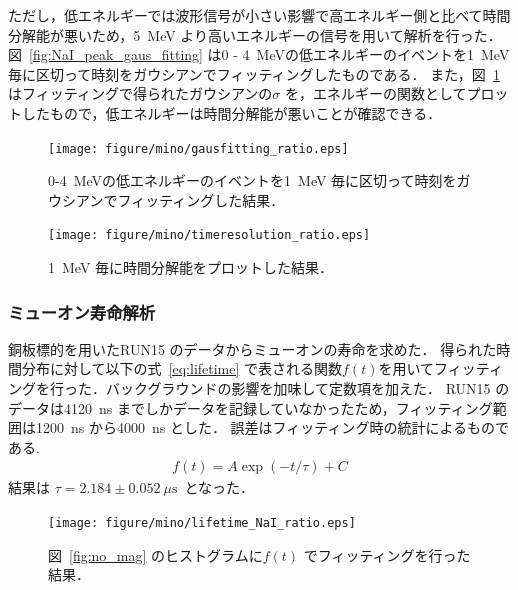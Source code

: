 ただし，低エネルギーでは波形信号が小さい影響で高エネルギー側と比べて時間分解能が悪いため，5~MeV より高いエネルギーの信号を用いて解析を行った．図~\ref{fig:NaI_peak_gaus_fitting} は0 - 4~MeVの低エネルギーのイベントを1~MeV 毎に区切って時刻をガウシアンでフィッティングしたものである．
また，図~\ref{fig:NaI_peak_time_resolution} はフィッティングで得られたガウシアンの$\sigma$ を，エネルギーの関数としてプロットしたもので，低エネルギーは時間分解能が悪いことが確認できる．

\begin{figure}[H]%
\begin{minipage}{0.5\hsize}
\centering
\texttt{[image: figure/mino/gausfitting\_ratio.eps]}
\caption{0-4~MeVの低エネルギーのイベントを1~MeV 毎に区切って時刻をガウシアンでフィッティングした結果．}
\label{fig:NaI_peak_gaus_fitting}
\end{minipage}
\begin{minipage}{0.5\hsize}
\centering
\texttt{[image: figure/mino/timeresolution\_ratio.eps]}
\caption{1~MeV 毎に時間分解能をプロットした結果．}
\label{fig:NaI_peak_time_resolution}
\end{minipage}
\end{figure}


\subsubsection{ミューオン寿命解析}
銅板標的を用いたRUN15 のデータからミューオンの寿命を求めた．
得られた時間分布に対して以下の式~\eqref{eq:lifetime} で表される関数$f(t)$を用いてフィッティングを行った．バックグラウンドの影響を加味して定数項を加えた．
RUN15 のデータは4120~ns までしかデータを記録していなかったため，フィッティング範囲は1200~ns から4000~ns とした．
誤差はフィッティング時の統計によるものである.
\begin{gather}
f(t) = A\exp(-t / \tau)+C \label{eq:lifetime}
\end{gather}
結果は $\tau = 2.184 \pm 0.052~\mu \mathrm{s}$~となった．
\begin{figure}[H]
\centering
\texttt{[image: figure/mino/lifetime\_NaI\_ratio.eps]}
\caption{図~\ref{fig:no_mag} のヒストグラムに$f(t)$ でフィッティングを行った結果．}
\end{figure}



